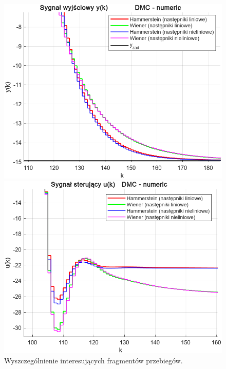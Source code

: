 \documentclass[a4paper,titlepage,11pt,floatssmall]{mwrep}
\begin{document}
\begin{figure}[p]
\begin{minipage}{0.495\linewidth}
    \centering
    \includegraphics[width=\linewidth]{pictures/DMC_numeric_y_zoom}
\end{minipage}
\hfill
\begin{minipage}{0.495\linewidth}
    \centering
    \includegraphics[width=\linewidth]{pictures/DMC_numeric_u_zoom}
\end{minipage}
\caption{Wyszczególnienie interesujących fragmentów przebiegów.}
\end{figure}

\end{document}

